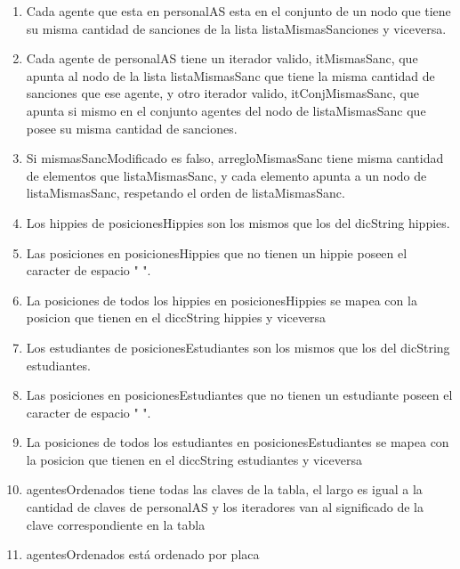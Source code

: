 \begin{enumerate}
	\item Cada agente que esta en personalAS esta en el conjunto de un nodo que tiene su misma cantidad de sanciones de la lista listaMismasSanciones y viceversa.

	\item Cada agente de personalAS tiene un iterador valido, itMismasSanc, que apunta al nodo de la lista listaMismasSanc que tiene la misma cantidad de sanciones que ese agente, y otro iterador valido, itConjMismasSanc, que apunta si mismo en el conjunto agentes del nodo de listaMismasSanc que posee su misma cantidad de sanciones.
	\item Si mismasSancModificado es falso, arregloMismasSanc tiene misma cantidad de elementos que listaMismasSanc, y cada elemento apunta a un nodo de listaMismasSanc, respetando el orden de listaMismasSanc.
	\item Los hippies de posicionesHippies son los mismos que los del dicString hippies.
	\item Las posiciones en posicionesHippies que no tienen un hippie poseen el caracter de espacio " ".
	\item La posiciones de todos los hippies en posicionesHippies se mapea con la posicion que tienen en el diccString hippies y viceversa
	\item Los estudiantes de posicionesEstudiantes son los mismos que los del dicString estudiantes.
	\item Las posiciones en posicionesEstudiantes que no tienen un estudiante poseen el caracter de espacio " ".
	\item La posiciones de todos los estudiantes en posicionesEstudiantes se mapea con la posicion que tienen en el diccString estudiantes y viceversa
	\item agentesOrdenados tiene todas las claves de la tabla, el largo es igual a la cantidad de claves de personalAS y los iteradores van al significado de la clave correspondiente en la tabla
	\item agentesOrdenados está ordenado por placa
\end{enumerate}

\pagebreak


